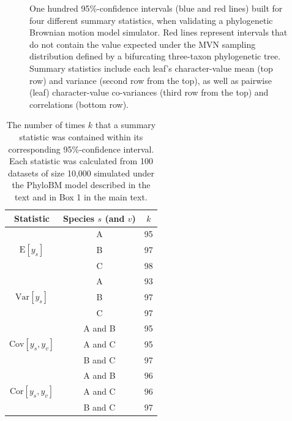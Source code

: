 \documentclass[oneside]{article}
\begin{document}
\begin{figure}
  \centering
  
  \caption{One hundred 95\%-confidence intervals (blue and red lines) built for four different summary statistics, when validating a phylogenetic Brownian motion model simulator.
    Red lines represent intervals that do not contain the value expected under the MVN sampling distribution defined by a bifurcating three-taxon phylogenetic tree.
    Summary statistics include each leaf's character-value mean (top row) and variance (second row from the top), as well as pairwise (leaf) character-value co-variances (third row from the top) and correlations (bottom row).}
  \label{supfig:bmsimcis}
\end{figure}

\begin{table}[h]
  \caption{The number of times $k$ that a summary statistic was contained within its corresponding 95\%-confidence interval.
    Each statistic was calculated from 100 datasets of size 10,000 simulated under the PhyloBM model described in the text and in Box 1 in the main text.}
  \label{suptab:bmsimcis}
  \centering
  \begin{tabular}{ ccc }
    \hline
    Statistic & Species $s$ (and $v$)& $k$\\
    \hline  
    \rowcolor{gray!10}                      & A & 95\\
    \rowcolor{gray!10} $\text{E}[y_s]$      & B & 97\\
    \rowcolor{gray!10}                      & C & 98\\
                                            & A & 93\\
                       $\text{Var}[y_s]$    & B & 97\\
                                            & C & 97\\
    \rowcolor{gray!10}                      & A and B & 95\\
    \rowcolor{gray!10}$\text{Cov}[y_s,y_v]$ & A and C & 95\\
    \rowcolor{gray!10}                      & B and C & 97\\
                                            & A and B & 96\\
                      $\text{Cor}[y_s,y_v]$ & A and C & 96\\
                                            & B and C & 97\\
    \hline
  \end{tabular}
\end{table}
\end{document}

